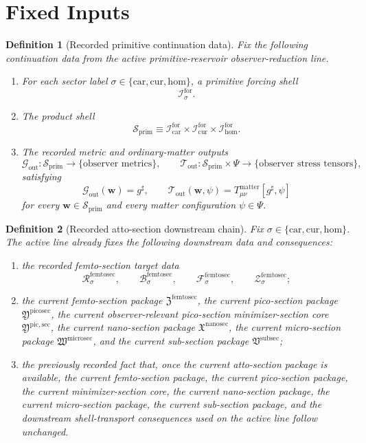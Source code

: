 \documentclass[11pt]{article}
\newcommand{\CompletedMetric}{g^{\sharp}}
\newcommand{\MatterSpace}{\Psi}
\newcommand{\Car}{\mathrm{car}}
\newcommand{\Cur}{\mathrm{cur}}
\newcommand{\Hom}{\mathrm{hom}}
\newcommand{\ForSpace}[1]{\mathcal I_{#1}^{\mathrm{for}}}
\newcommand{\PrimShell}{\mathcal S_{\mathrm{prim}}}
\newcommand{\MetricOut}{\mathscr G_{\mathrm{out}}}
\newcommand{\MatterOut}{\mathscr T_{\mathrm{out}}}
\newcommand{\SubSectionPackage}{\mathfrak V^{\mathrm{subsec}}}
\newcommand{\MicroSectionPackage}{\mathfrak W^{\mathrm{microsec}}}
\newcommand{\NanoSectionPackage}{\mathfrak X^{\mathrm{nanosec}}}
\newcommand{\PicoSectionPackage}{\mathfrak Y^{\mathrm{picosec}}}
\newcommand{\PicoMinSectionCore}{\mathfrak Y^{\mathrm{pic,sec}}}
\newcommand{\FemtoSectionPackage}{\mathfrak Z^{\mathrm{femtosec}}}
\newcommand{\FemtoSectionSpace}[1]{\mathcal R_{#1}^{\mathrm{femtosec}}}
\newcommand{\FemtoSectionBody}[1]{\mathcal B_{#1}^{\mathrm{femtosec}}}
\newcommand{\FemtoSectionFunctional}[1]{\mathscr F_{#1}^{\mathrm{femtosec}}}
\newcommand{\FemtoSectionShell}[1]{\mathcal Z_{#1}^{\mathrm{femtosec}}}
\newtheorem{definition}{Definition}
\begin{document}
\section{Fixed Inputs}

\begin{definition}[Recorded primitive continuation data]
\label{def:fixed}
Fix the following continuation data from the active primitive-reservoir observer-reduction line.
\begin{enumerate}
    \item For each sector label \(\sigma\in\{\Car,\Cur,\Hom\}\), a primitive forcing shell
    \[
    \ForSpace{\sigma}.
    \]
    \item The product shell
    \[
    \PrimShell
    \equiv
    \ForSpace{\Car}\times \ForSpace{\Cur}\times \ForSpace{\Hom}.
    \]
    \item The recorded metric and ordinary-matter outputs
    \[
    \MetricOut:\PrimShell\to\{\text{observer metrics}\},
    \qquad
    \MatterOut:\PrimShell\times\MatterSpace\to\{\text{observer stress tensors}\},
    \]
    satisfying
    \begin{equation}
    \MetricOut(\mathbf w)=\CompletedMetric,
    \qquad
    \MatterOut(\mathbf w,\psi)
    =
    T_{\mu\nu}^{\mathrm{matter}}[\CompletedMetric,\psi]
    \label{eq:fixedoutputs}
    \end{equation}
    for every \(\mathbf w\in\PrimShell\) and every matter configuration \(\psi\in\MatterSpace\).
\end{enumerate}
\end{definition}

\begin{definition}[Recorded atto-section downstream chain]
\label{def:downstream}
Fix \(\sigma\in\{\Car,\Cur,\Hom\}\). The active line already fixes the following downstream data and consequences:
\begin{enumerate}
    \item the recorded femto-section target data
    \[
    \FemtoSectionSpace{\sigma},\qquad
    \FemtoSectionBody{\sigma},\qquad
    \FemtoSectionFunctional{\sigma},\qquad
    \FemtoSectionShell{\sigma};
    \]
    \item the current femto-section package \(\FemtoSectionPackage\), the current pico-section package \(\PicoSectionPackage\), the current observer-relevant pico-section minimizer-section core \(\PicoMinSectionCore\), the current nano-section package \(\NanoSectionPackage\), the current micro-section package \(\MicroSectionPackage\), and the current sub-section package \(\SubSectionPackage\);
    \item the previously recorded fact that, once the current atto-section package is available, the current femto-section package, the current pico-section package, the current minimizer-section core, the current nano-section package, the current micro-section package, the current sub-section package, and the downstream shell-transport consequences used on the active line follow unchanged.
\end{enumerate}
\end{definition}
\end{document}
